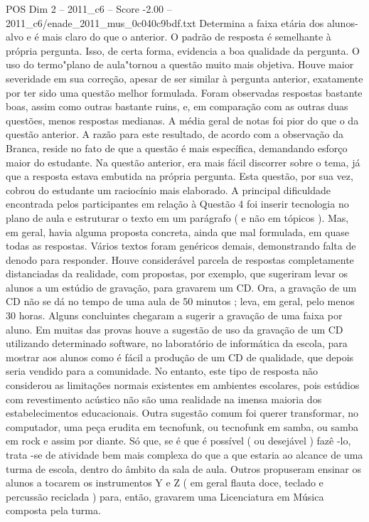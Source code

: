\begin{textsample}{POS Dim 2 – 2011\_c6 – Score -2.00 – 2011\_c6/enade\_2011\_mus\_0c040c9bdf.txt}
Determina a faixa etária dos alunos-alvo e é mais claro do que o anterior.
O padrão de resposta é semelhante à própria pergunta.
Isso, de certa forma, evidencia a boa qualidade da pergunta.
O uso do termo"plano de aula"tornou a questão muito mais objetiva.
Houve maior severidade em sua correção, apesar de ser similar à pergunta anterior, exatamente por ter sido uma questão melhor formulada.
Foram observadas respostas bastante boas, assim como outras bastante ruins, e, em comparação com as outras duas questões, menos respostas medianas.
A média geral de notas foi pior do que o da questão anterior.
A razão para este resultado, de acordo com a observação da Branca, reside no fato de que a questão é mais específica, demandando esforço maior do estudante.
Na questão anterior, era mais fácil discorrer sobre o tema, já que a resposta estava embutida na própria pergunta.
Esta questão, por sua vez, cobrou do estudante um raciocínio mais elaborado.
A principal dificuldade encontrada pelos participantes em relação à Questão 4 foi inserir tecnologia no plano de aula e estruturar o texto em um parágrafo ( e não em tópicos ).
Mas, em geral, havia alguma proposta concreta, ainda que mal formulada, em quase todas as respostas.
Vários textos foram genéricos demais, demonstrando falta de denodo para responder.
Houve considerável parcela de respostas completamente distanciadas da realidade, com propostas, por exemplo, que sugeriram levar os alunos a um estúdio de gravação, para gravarem um CD.
Ora, a gravação de um CD não se dá no tempo de uma aula de 50 minutos ; leva, em geral, pelo menos 30 horas.
Alguns concluintes chegaram a sugerir a gravação de uma faixa por aluno.
Em muitas das provas houve a sugestão de uso da gravação de um CD utilizando determinado software, no laboratório de informática da escola, para mostrar aos alunos como é fácil a produção de um CD de qualidade, que depois seria vendido para a comunidade.
No entanto, este tipo de resposta não considerou as limitações normais existentes em ambientes escolares, pois estúdios com revestimento acústico não são uma realidade na imensa maioria dos estabelecimentos educacionais.
Outra sugestão comum foi querer transformar, no computador, uma peça erudita em tecnofunk, ou tecnofunk em samba, ou samba em rock e assim por diante.
Só que, se é que é possível ( ou desejável ) fazê -lo, trata -se de atividade bem mais complexa do que a que estaria ao alcance de uma turma de escola, dentro do âmbito da sala de aula.
Outros propuseram ensinar os alunos a tocarem os instrumentos Y e Z ( em geral flauta doce, teclado e percussão reciclada ) para, então, gravarem uma Licenciatura em Música composta pela turma.

\end{textsample}
